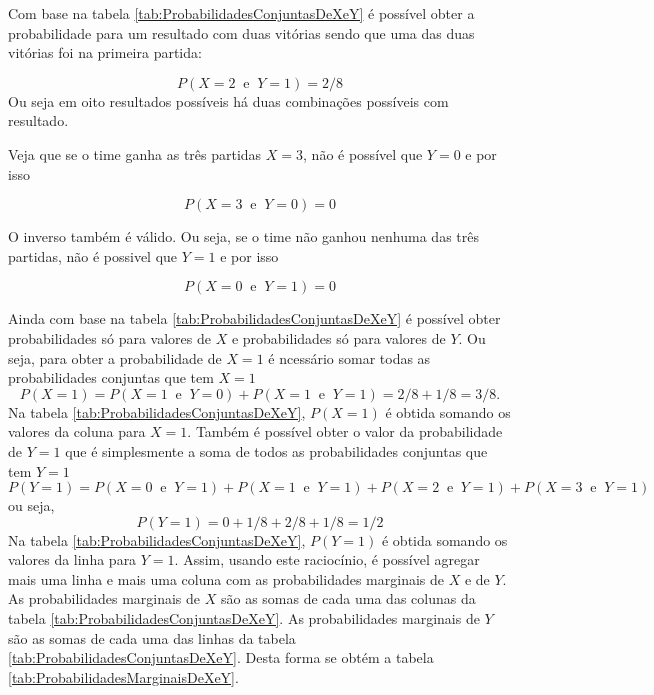 \documentclass[
]{book}
\begin{document}
Com base na tabela \ref{tab:ProbabilidadesConjuntasDeXeY} é possível obter a probabilidade para um resultado com duas vitórias sendo que uma das duas vitórias foi na primeira partida:

\[
  P(X=2~\text{ e }~Y=1) = 2/8
\]
Ou seja em oito resultados possíveis há duas combinações possíveis com resultado.

Veja que se o time ganha as três partidas \(X=3\), não é possível que \(Y=0\) e por isso

\[
  P(X=3~\text{ e }~Y=0 ) = 0
\]

O inverso também é válido. Ou seja, se o time não ganhou nenhuma das três partidas, não é possivel que \(Y=1\) e por isso

\[
  P(X=0~\text{ e }~Y=1) = 0
\]

Ainda com base na tabela \ref{tab:ProbabilidadesConjuntasDeXeY} é possível obter probabilidades só para valores de \(X\) e probabilidades só para valores de \(Y\). Ou seja, para obter a probabilidade de \(X=1\) é ncessário somar todas as probabilidades conjuntas que tem \(X=1\)
\[
  P(X = 1) = P(X=1~\text{ e }~Y=0) + P(X=1~\text{ e }~Y=1) = 2/8 + 1/8 = 3/8.
\]
Na tabela \ref{tab:ProbabilidadesConjuntasDeXeY}, \(P(X = 1)\) é obtida somando os valores da coluna para \(X=1\).
Também é possível obter o valor da probabilidade de \(Y=1\) que é simplesmente a soma de todos as probabilidades conjuntas que tem \(Y=1\)
\[
  P(Y=1) = P(X=0~\text{ e }~Y=1) + P(X=1~\text{ e }~Y=1) +P(X=2~\text{ e }~Y=1) + P(X=3~\text{ e }~Y=1)
\]
ou seja,
\[
  P(Y=1) = 0 + 1/8 +2/8 + 1/8 = 1/2
\]
Na tabela \ref{tab:ProbabilidadesConjuntasDeXeY}, \(P(Y=1)\) é obtida somando os valores da linha para \(Y=1\).
Assim, usando este raciocínio, é possível agregar mais uma linha e mais uma coluna com as probabilidades marginais de \(X\) e de \(Y\). As probabilidades marginais de \(X\) são as somas de cada uma das colunas da tabela \ref{tab:ProbabilidadesConjuntasDeXeY}. As probabilidades marginais de \(Y\) são as somas de cada uma das linhas da tabela \ref{tab:ProbabilidadesConjuntasDeXeY}. Desta forma se obtém a tabela \ref{tab:ProbabilidadesMarginaisDeXeY}.
\end{document}
